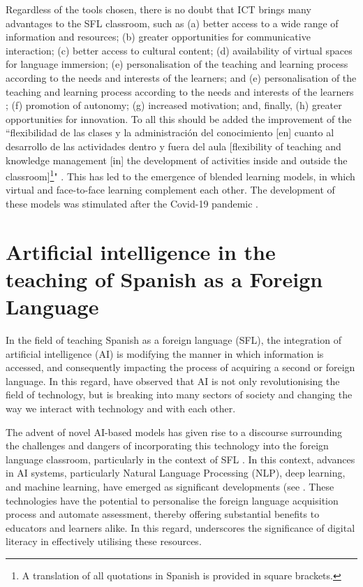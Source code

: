 \documentclass[english]{textolivre}
\begin{document}
Regardless of the tools chosen, there is no doubt that ICT brings many advantages to the SFL classroom, such as (a) better access to a wide range of information and resources; (b) greater opportunities for communicative interaction; (c) better access to cultural content; (d) availability of virtual spaces for language immersion; (e) personalisation of the teaching and learning process according to the needs and interests of the learners; and (e) personalisation of the teaching and learning process according to the needs and interests of the learners \cite{intria2023, clementi2024}; (f) promotion of autonomy; (g) increased motivation; and, finally, (h) greater opportunities for innovation. To all this should be added the improvement of the ``flexibilidad de las clases y la administración del conocimiento [en] cuanto al desarrollo de las actividades dentro y fuera del aula [flexibility of teaching and knowledge management [in] the development of activities inside and outside the classroom]\footnote{A translation of all quotations in Spanish is provided in square brackets.}" \cite[p. 264]{moreno-padilla2019}. This has led to the emergence of blended learning models, in which virtual and face-to-face learning complement each other. The development of these models was stimulated after the Covid-19 pandemic \cite{bartolome2018, perez-garcia2021, roman2024, fabregat-barrios2024a}.

\section{Artificial intelligence in the teaching of Spanish as a Foreign Language}
In the field of teaching Spanish as a foreign language (SFL), the integration of artificial intelligence (AI) is modifying the manner in which information is accessed, and consequently impacting the process of acquiring a second or foreign language. In this regard, \textcite{portillo2024iaele} have observed that AI is not only revolutionising the field of technology, but is breaking into many sectors of society and changing the way we interact with technology and with each other.

The advent of novel AI-based models has given rise to a discourse surrounding the challenges and dangers of incorporating this technology into the foreign language classroom, particularly in the context of SFL \cite{chen2020, alam2021ai_education, ouyang2021review}. In this context, advances in AI systems, particularly Natural Language Processing (NLP), deep learning, and machine learning, have emerged as significant developments (see \textcite{gonzalez-gonzalez2023}. These technologies have the potential to personalise the foreign language acquisition process and automate assessment, thereby offering substantial benefits to educators and learners alike. In this regard, \textcite{ocana-fernandez2019} underscores the significance of digital literacy in effectively utilising these resources.
\end{document}
